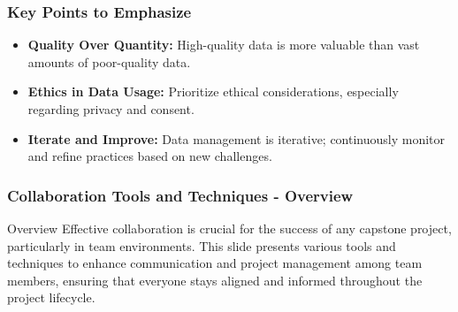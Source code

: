 \documentclass[aspectratio=169]{beamer}
\begin{document}
\begin{frame}[fragile]
    \frametitle{Key Points to Emphasize}
    \begin{itemize}
        \item \textbf{Quality Over Quantity:} High-quality data is more valuable than vast amounts of poor-quality data.
        \item \textbf{Ethics in Data Usage:} Prioritize ethical considerations, especially regarding privacy and consent.
        \item \textbf{Iterate and Improve:} Data management is iterative; continuously monitor and refine practices based on new challenges.
    \end{itemize}
\end{frame}

\begin{frame}[fragile]
    \frametitle{Collaboration Tools and Techniques - Overview}
    \begin{block}{Overview}
        Effective collaboration is crucial for the success of any capstone project, particularly in team environments. 
        This slide presents various tools and techniques to enhance communication and project management among team members, ensuring that everyone stays aligned and informed throughout the project lifecycle.
    \end{block}
\end{frame}
\end{document}
